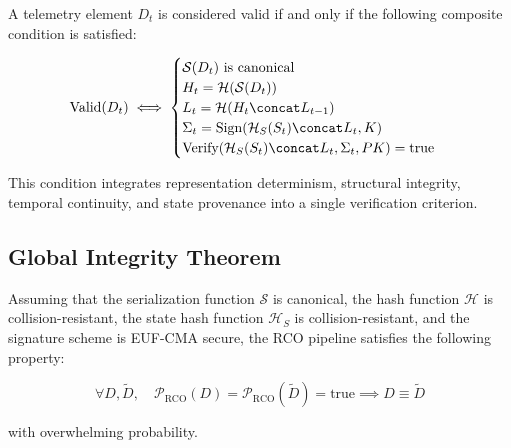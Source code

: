 A telemetry element $D_t$ is considered valid if and only if the following composite condition is satisfied:

\begin{equation}
\text{Valid}(D_t) \iff
\begin{cases}
\mathcal{S}(D_t) \text{ is canonical} \\
H_t = \mathcal{H}(\mathcal{S}(D_t)) \\
L_t = \mathcal{H}(H_t \concat L_{t-1}) \\
\Sigma_t = \text{Sign}(\mathcal{H}_S(S_t) \concat L_t, K) \\
\text{Verify}(\mathcal{H}_S(S_t) \concat L_t, \Sigma_t, PK) = \text{true}
\end{cases}
\end{equation}

This condition integrates representation determinism, structural integrity, temporal continuity, and state provenance into a single verification criterion.

\subsection{Global Integrity Theorem}

\begin{theorem}
Assuming that the serialization function $\mathcal{S}$ is canonical, the hash function $\mathcal{H}$ is collision-resistant, the state hash function $\mathcal{H}_S$ is collision-resistant, and the signature scheme is EUF-CMA secure, the RCO pipeline satisfies the following property:

\[
\forall D, \tilde{D}, \quad \mathcal{P}_{\text{RCO}}(D) = \mathcal{P}_{\text{RCO}}(\tilde{D}) = \text{true} \implies D \equiv \tilde{D}
\]

with overwhelming probability.
\end{theorem}

